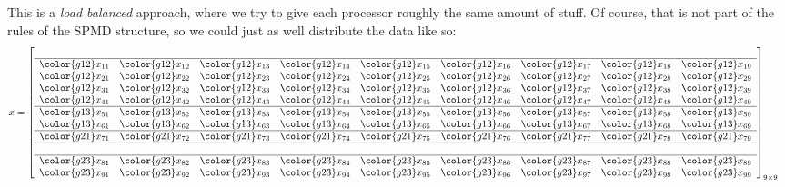 This is a \emph{load balanced} approach, where we try to give each processor
roughly the same amount of stuff. Of course, that is not part of the
rules of the SPMD structure, so we could just as well distribute
the data like so:
\begin{align*}
x &= \left[
      \begin{array}{lllllllll}
      \\\hline
      \color{g12}x_{11} & \color{g12}x_{12} & \color{g12}x_{13} & \color{g12}x_{14} & \color{g12}x_{15} & \color{g12}x_{16} & \color{g12}x_{17} & \color{g12}x_{18} & \color{g12}x_{19}\\
      \color{g12}x_{21} & \color{g12}x_{22} & \color{g12}x_{23} & \color{g12}x_{24} & \color{g12}x_{25} & \color{g12}x_{26} & \color{g12}x_{27} & \color{g12}x_{28} & \color{g12}x_{29}\\
      \color{g12}x_{31} & \color{g12}x_{32} & \color{g12}x_{33} & \color{g12}x_{34} & \color{g12}x_{35} & \color{g12}x_{36} & \color{g12}x_{37} & \color{g12}x_{38} & \color{g12}x_{39}\\
      \color{g12}x_{41} & \color{g12}x_{42} & \color{g12}x_{43} & \color{g12}x_{44} & \color{g12}x_{45} & \color{g12}x_{46} & \color{g12}x_{47} & \color{g12}x_{48} & \color{g12}x_{49}\\\hline
      \color{g13}x_{51} & \color{g13}x_{52} & \color{g13}x_{53} & \color{g13}x_{54} & \color{g13}x_{55} & \color{g13}x_{56} & \color{g13}x_{57} & \color{g13}x_{58} & \color{g13}x_{59}\\
      \color{g13}x_{61} & \color{g13}x_{62} & \color{g13}x_{63} & \color{g13}x_{64} & \color{g13}x_{65} & \color{g13}x_{66} & \color{g13}x_{67} & \color{g13}x_{68} & \color{g13}x_{69}\\\hline
      \color{g21}x_{71} & \color{g21}x_{72} & \color{g21}x_{73} & \color{g21}x_{74} & \color{g21}x_{75} & \color{g21}x_{76} & \color{g21}x_{77} & \color{g21}x_{78} & \color{g21}x_{79}\\\hline\\\hline
      \color{g23}x_{81} & \color{g23}x_{82} & \color{g23}x_{83} & \color{g23}x_{84} & \color{g23}x_{85} & \color{g23}x_{86} & \color{g23}x_{87} & \color{g23}x_{88} & \color{g23}x_{89}\\
      \color{g23}x_{91} & \color{g23}x_{92} & \color{g23}x_{93} & \color{g23}x_{94} & \color{g23}x_{95} & \color{g23}x_{96} & \color{g23}x_{97} & \color{g23}x_{98} & \color{g23}x_{99}\\
      \end{array}
\right]_{9\times 9}
\end{align*}
